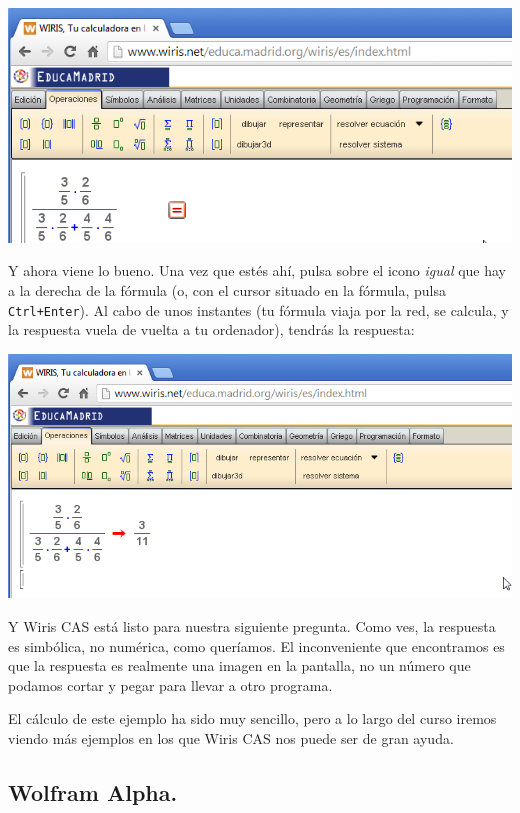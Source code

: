 \documentclass[10pt,a4paper]{article}\usepackage[]{graphicx}\usepackage[]{color}
\newcounter {cont01}
\begin{document}
     \begin{center}
\includegraphics[width=15.5cm]{./fig/Tut04-13.png}
\end{center}
Y ahora viene lo bueno. Una vez que estés ahí, pulsa sobre el icono {\em igual} que hay a la derecha de la fórmula (o, con el cursor situado en la fórmula, pulsa {\tt Ctrl+Enter}). Al cabo de unos instantes (tu fórmula viaja por la red, se calcula, y la respuesta vuela de vuelta a tu ordenador), tendrás la respuesta:
     \begin{center}
\includegraphics[width=15.5cm]{./fig/Tut04-14.png}
\end{center}
Y Wiris CAS está listo para nuestra siguiente pregunta. Como ves, la respuesta es simbólica, no numérica, como queríamos. El inconveniente que encontramos es que la respuesta es realmente una imagen en la pantalla, no un número que podamos cortar y pegar para llevar a otro programa.

El cálculo de este ejemplo ha sido muy sencillo, pero a lo largo del curso iremos viendo más ejemplos en los que Wiris CAS nos puede ser de gran ayuda.

\subsection{Wolfram Alpha.}
\label{tut03:subsec:WolframAlpha}
\end{document}
